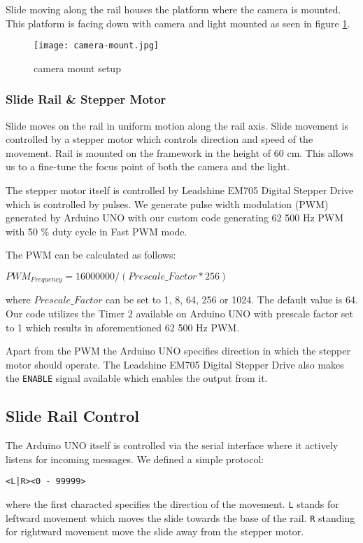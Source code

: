 Slide moving along the rail houses the platform where the camera is mounted. This platform is facing down with camera and light mounted as seen in figure \ref{fig:camera-mount}.

\begin{figure}[ht]
    \label{fig:camera-mount}
    \centering
    \texttt{[image: camera-mount.jpg]}
    \caption{camera mount setup}
\end{figure}


\subsubsection*{Slide Rail \& Stepper Motor}
Slide moves on the rail in uniform motion along the rail axis. Slide movement is controlled by a stepper motor which controls direction and speed of the movement.
Rail is mounted on the framework in the height of 60 cm. This allows us to a fine-tune the focus point of both the camera and the light.

The stepper motor itself is controlled by Leadshine EM705 Digital Stepper Drive which is controlled by pulses. We generate pulse width modulation (PWM) generated by Arduino UNO with our custom code generating 62 500 Hz PWM with 50 \% duty cycle in Fast PWM mode.

The PWM can be calculated as follows:

${PWM}_{Frequency} = 16000000 / (Prescale\_Factor * 256)$

where $Prescale\_Factor$ can be set to 1, 8, 64, 256 or 1024. The default value is 64. Our code utilizes the Timer 2 available on Arduino UNO with prescale factor set to 1 which results in aforementioned 62 500 Hz PWM.

Apart from the PWM the Arduino UNO specifies direction in which the stepper motor should operate. The Leadshine EM705 Digital Stepper Drive also makes the \texttt{ENABLE} signal available which enables the output from it.

\subsection{Slide Rail Control}
\label{sec:serial}
The Arduino UNO itself is controlled via the serial interface where it actively listens for incoming messages. We defined a simple protocol:
\begin{verbatim}
<L|R><0 - 99999>
\end{verbatim}
where the first characted specifies the direction of the movement. \texttt{L} stands for leftward movement which moves the slide towards the base of the rail. \texttt{R} standing for rightward movement move the slide away from the stepper motor.

